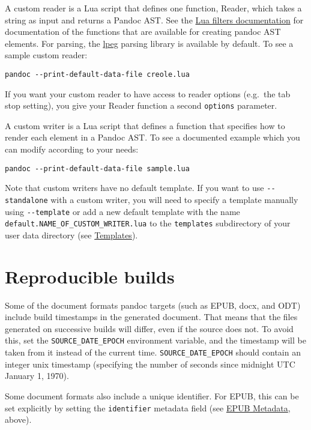 \documentclass[
]{article}
\begin{document}
A custom reader is a Lua script that defines one function, Reader, which
takes a string as input and returns a Pandoc AST. See the
\href{https://pandoc.org/lua-filters.html}{Lua filters documentation}
for documentation of the functions that are available for creating
pandoc AST elements. For parsing, the
\href{http://www.inf.puc-rio.br/~roberto/lpeg/}{lpeg} parsing library is
available by default. To see a sample custom reader:

\begin{verbatim}
pandoc --print-default-data-file creole.lua
\end{verbatim}

If you want your custom reader to have access to reader options
(e.g.~the tab stop setting), you give your Reader function a second
\texttt{options} parameter.

A custom writer is a Lua script that defines a function that specifies
how to render each element in a Pandoc AST. To see a documented example
which you can modify according to your needs:

\begin{verbatim}
pandoc --print-default-data-file sample.lua
\end{verbatim}

Note that custom writers have no default template. If you want to use
\texttt{-\/-standalone} with a custom writer, you will need to specify a
template manually using \texttt{-\/-template} or add a new default
template with the name \texttt{default.NAME\_OF\_CUSTOM\_WRITER.lua} to
the \texttt{templates} subdirectory of your user data directory (see
\protect\hyperlink{templates}{Templates}).

\hypertarget{reproducible-builds}{%
\section{Reproducible builds}\label{reproducible-builds}}

Some of the document formats pandoc targets (such as EPUB, docx, and
ODT) include build timestamps in the generated document. That means that
the files generated on successive builds will differ, even if the source
does not. To avoid this, set the \texttt{SOURCE\_DATE\_EPOCH}
environment variable, and the timestamp will be taken from it instead of
the current time. \texttt{SOURCE\_DATE\_EPOCH} should contain an integer
unix timestamp (specifying the number of seconds since midnight UTC
January 1, 1970).

Some document formats also include a unique identifier. For EPUB, this
can be set explicitly by setting the \texttt{identifier} metadata field
(see \protect\hyperlink{epub-metadata}{EPUB Metadata}, above).
\end{document}
